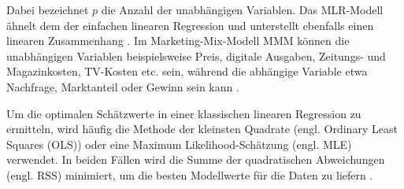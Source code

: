 Dabei bezeichnet \(p\) die Anzahl der unabhängigen Variablen. Das \ac{MLR}-Modell ähnelt dem der einfachen linearen Regression und unterstellt ebenfalls einen linearen Zusammenhang \cite{frick2021data}. Im Marketing-Mix-Modell \ac{MMM} können die unabhängigen Variablen beispielsweise Preis, digitale Ausgaben, Zeitungs- und Magazinkosten, TV-Kosten etc. sein,
während die abhängige Variable etwa Nachfrage, Marktanteil oder Gewinn sein kann \cite{akinkunmi2018data}.
\par
Um die optimalen Schätzwerte in einer klassischen linearen Regression zu ermitteln, wird häufig die Methode der kleinsten Quadrate (engl. Ordinary Least Squares (\ac{OLS})) oder eine Maximum Likelihood-Schätzung (engl. \ac{MLE}) verwendet. In beiden Fällen wird die Summe der quadratischen Abweichungen (engl. \ac{RSS}) minimiert, um die besten Modellwerte für die Daten zu liefern \cite[S. 246]{frick2021data}. 
